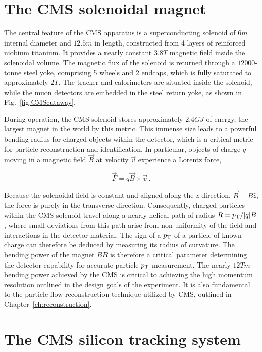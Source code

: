 \section{The CMS solenoidal magnet}

The central feature of the CMS apparatus is a superconducting solenoid 
of $6\unit{m}$ internal diameter and $12.5\unit{m}$ in length,
constructed from 4 layers of reinforced niobium titanium.
It provides a nearly constant $3.8\unit{T}$ magnetic field inside the solenoidal volume.
The magnetic flux of the solenoid is returned through
a $12 000$-tonne steel yoke, comprising 5 wheels and 2 endcaps,
which is fully saturated to approximately $2\unit{T}$. 
The tracker and calorimeters are situated inside the solenoid, while 
the muon detectors are embedded in the steel return yoke, as shown
in Fig.~\ref{fig:CMScutaway}.

During operation, the CMS solenoid stores approximately $2.4\unit{GJ}$ of 
energy, the largest magnet in the world by this metric. This immense
size leads to a powerful bending radius for charged objects within the detector,
which is a critical metric for particle reconstruction and identification.
In particular, objects of charge $q$ moving
in a magnetic field $\vec{B}$ at velocity $\vec{v}$ experience a Lorentz force,

\begin{equation}
  \vec{F} = q\vec{B} \times \vec{v} \,.
\end{equation}

Because the solenoidal field is constant and aligned along the $z$-direction, 
$\vec{B} = B\hat{z}$, the force is purely in the transverse direction.
Consequently, charged particles within the CMS
solenoid travel along a nearly helical path of radius $R=p_{\mathrm{T}}/\lvert q \rvert B$, where 
small deviations from this path arise from non-uniformity of the field
and interactions in the detector material. The sign of a 
$p_{\mathrm{T}}$ of a particle of known charge can therefore be deduced by measuring its radius of
curvature. The bending power of the magnet $BR$ is therefore a critical 
parameter determining the detector capability for accurate particle $p_{\mathrm{T}}$ measurement.
The nearly $12\unit{Tm}$ bending power achieved by the CMS is critical to achieving
the high momentum resolution outlined in the design goals of the experiment. It
is also fundamental to the particle flow reconstruction technique utilized by CMS,
outlined in Chapter~\ref{ch:reconstruction}.

\section{The CMS silicon tracking system}
